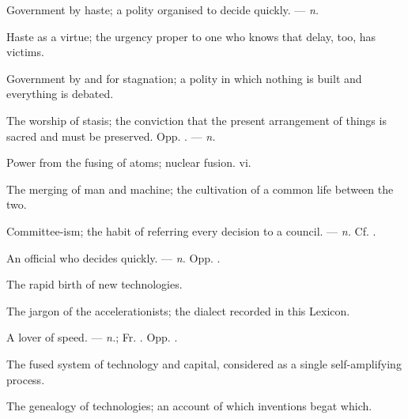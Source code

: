  Government by haste; a polity organised to decide quickly. ---  \textit{n.}

 Haste as a virtue; the urgency proper to one who knows that delay, too, has victims.

 Government by and for stagnation; a polity in which nothing is built and everything is debated.

 The worship of stasis; the conviction that the present arrangement of things is sacred and must be preserved. Opp. . ---  \textit{n.}

 Power from the fusing of atoms; nuclear fusion.   vi.

 The merging of man and machine; the cultivation of a common life between the two.

 Committee-ism; the habit of referring every decision to a council. ---  \textit{n.} Cf. .

 An official who decides quickly. ---  \textit{n.} Opp. .

 The rapid birth of new technologies.

 The jargon of the accelerationists; the dialect recorded in this Lexicon.

 A lover of speed. ---  \textit{n.}; Fr. . Opp. .

 The fused system of technology and capital, considered as a single self-amplifying process.

 The genealogy of technologies; an account of which inventions begat which.

